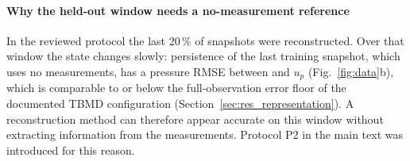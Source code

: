 \paragraph{Why the held-out window needs a no-measurement reference} In the reviewed protocol the last 20\,\% of snapshots were reconstructed. Over that window the state changes slowly: persistence of the last training snapshot, which uses no measurements, has a pressure RMSE between \PersistFirst{} and \PersistLast{} $u_p$ (Fig.~\ref{fig:data}b), which is comparable to or below the full-observation error floor of the documented TBMD configuration (Section~\ref{sec:res_representation}). A reconstruction method can therefore appear accurate on this window without extracting information from the measurements. Protocol P2 in the main text was introduced for this reason.
